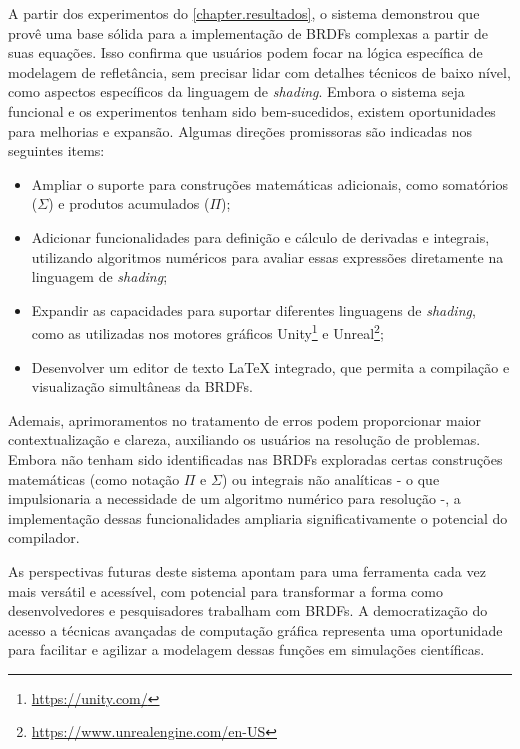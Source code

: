 
A partir dos experimentos do \autoref{chapter.resultados}, o sistema demonstrou que provê uma base sólida para a implementação de BRDFs complexas a partir de suas equações. Isso confirma que usuários podem focar na lógica específica de modelagem de refletância, sem precisar lidar com detalhes técnicos de baixo nível, como aspectos específicos da linguagem de \textit{shading}. Embora o sistema seja funcional e os experimentos tenham sido bem-sucedidos, existem oportunidades para melhorias e expansão. Algumas direções promissoras são indicadas nos seguintes items:

\begin{itemize}
    \item Ampliar o suporte para construções matemáticas adicionais, como somatórios ($\Sigma$) e produtos acumulados ($\Pi$);
    \label{items-melhorias}
    \item Adicionar funcionalidades para definição e cálculo de derivadas e integrais, utilizando algoritmos numéricos para avaliar essas expressões diretamente na linguagem de \textit{shading};
    \item Expandir as capacidades para suportar diferentes linguagens de \textit{shading}, como as utilizadas nos motores gráficos Unity\footnote{\url{https://unity.com/}} e Unreal\footnote{\url{https://www.unrealengine.com/en-US}};
    \item Desenvolver um editor de texto \LaTeX{} integrado, que permita a compilação e visualização simultâneas da BRDFs.
\end{itemize}

Ademais, aprimoramentos no tratamento de erros podem proporcionar maior contextualização e clareza, auxiliando os usuários na resolução de problemas. Embora não tenham sido identificadas nas BRDFs exploradas certas construções matemáticas (como notação $\Pi$ e $\Sigma$) ou integrais não analíticas - o que impulsionaria a necessidade de um algoritmo numérico para resolução -, a implementação dessas funcionalidades ampliaria significativamente o potencial do compilador.

As perspectivas futuras deste sistema apontam para uma ferramenta cada vez mais versátil e acessível, com potencial para transformar a forma como desenvolvedores e pesquisadores trabalham com BRDFs. A democratização do acesso a técnicas avançadas de computação gráfica representa uma oportunidade para facilitar e agilizar a modelagem dessas funções em simulações científicas.

